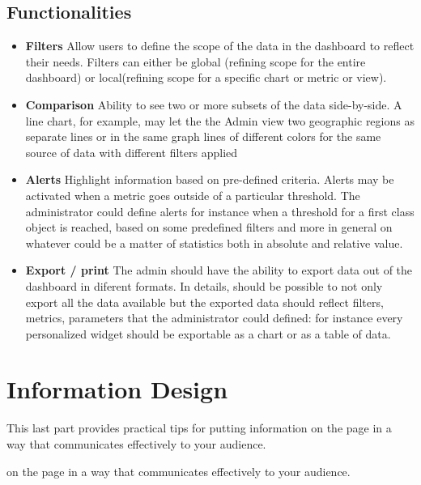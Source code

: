\documentclass[a4paper,12pt]{report}
\begin{document}
\subsection{Functionalities}
\begin{itemize}
\item \textbf{Filters}\newline
Allow users to define the scope of the data in the dashboard to reflect their needs. Filters can either be global (refining scope for the entire dashboard) or local(refining scope for a specific chart or metric or view).

\item \textbf{Comparison}\newline
Ability to see two or more subsets of the data side-by-side. A line chart, for example, may let the the Admin view two geographic regions as separate lines or in the same graph lines of different colors for the same source of data with different filters applied

\item \textbf{Alerts}\newline
Highlight information based on pre-defined criteria. Alerts may be activated when a metric goes outside of a particular threshold.  The administrator could define alerts for instance when a threshold for a first class object is reached, based on some predefined filters and more in general on whatever could be a matter of statistics both in absolute and relative value.

\item \textbf{Export / print}\newline
The  admin should have the ability to export data out of the dashboard in diferent formats. In details, should be possible to not only export all the data available but the exported data should reflect filters, metrics, parameters that the administrator could defined: for instance every personalized widget should be exportable as a chart or as a table of data.
\end{itemize}

\section{Information Design}
This last part provides practical tips for putting information on the page in a way that communicates effectively to your audience.



on the page in a way that communicates effectively to your audience.
\end{document}
